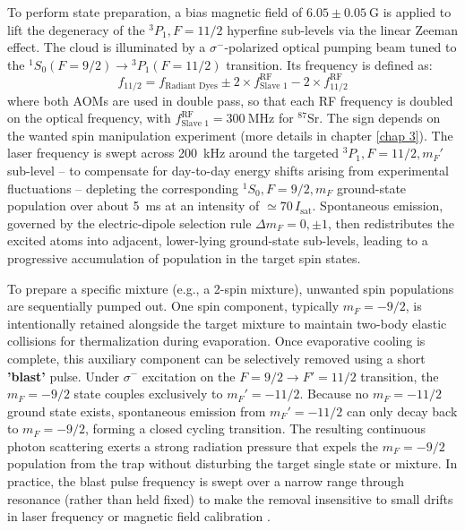 To perform state preparation, a bias magnetic field of $6.05 \pm 0.05~\text{G}$ is applied to lift the degeneracy of the $^3P_1, F = 11/2$ hyperfine sub-levels via the linear Zeeman effect. The cloud is illuminated by a $\sigma^-$-polarized optical pumping beam tuned to the $^1S_0 (F=9/2) \rightarrow {}^3P_1 (F=11/2)$ transition. Its frequency is defined as:
\begin{equation}
f_{11/2} = f_{\text{Radiant Dyes}} \pm 2\times f_{\text{Slave 1}}^{\text{RF}} - 2\times f_{11/2}^{\text{RF}}
\end{equation}
where both AOMs are used in double pass, so that each RF frequency is doubled on the optical
frequency, with $f_{\text{Slave 1}}^{\text{RF}}=300~\text{MHz}$ for $^{87}$Sr.
The sign depends on the wanted spin manipulation experiment (more details in chapter \ref{chap 3}).
The laser frequency is swept across 200~kHz around the targeted $^3P_1, F=11/2, m_F'$
sub-level -- to compensate for day-to-day energy shifts arising from experimental
fluctuations -- depleting the corresponding $^1S_0, F=9/2, m_F$ ground-state population
over about 5~ms at an intensity of $\simeq 70\,I_{\text{sat}}$. Spontaneous emission,
governed by the electric-dipole selection rule $\Delta m_F = 0, \pm 1$, then redistributes
the excited atoms into adjacent, lower-lying ground-state sub-levels, leading to a
progressive accumulation of population in the target spin states.

To prepare a specific mixture (e.g., a 2-spin mixture), unwanted spin populations are sequentially pumped out. One spin component, typically $m_F = -9/2$, is intentionally retained alongside the target mixture to maintain two-body elastic collisions for thermalization during evaporation. Once evaporative cooling is complete, this auxiliary component can be selectively removed using a short \textbf{'blast'} pulse. Under $\sigma^-$ excitation on the $F=9/2 \rightarrow F'=11/2$ transition, the $m_F = -9/2$ state couples exclusively to $m_F' = -11/2$. Because no $m_F = -11/2$ ground state exists, spontaneous emission from $m_F' = -11/2$ can only decay back to $m_F = -9/2$, forming a closed cycling transition. The resulting continuous photon scattering exerts a strong radiation pressure that expels the $m_F = -9/2$ population from the trap without disturbing the target single state or mixture. In practice, the blast pulse frequency is swept over a narrow range through resonance
(rather than held fixed) to make the removal insensitive to small drifts in laser
frequency or magnetic field calibration \cite{Bataille2020}.

